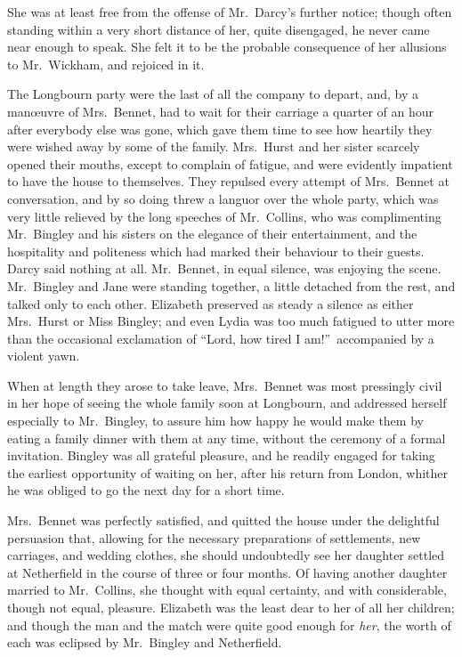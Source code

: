 \documentclass[12pt,english,oneside]{book}
\begin{document}
She was at least free from the offense of Mr.\ Darcy's further notice;
though often standing within a very short distance of her, quite disengaged,
he never came near enough to speak. She felt it to be the probable
consequence of her allusions to Mr.\ Wickham, and rejoiced in it.

The Longbourn party were the last of all the company to depart, and,
by a man\oe{}uvre of Mrs.\ Bennet, had to wait for their carriage
a quarter of an hour after everybody else was gone, which gave them
time to see how heartily they were wished away by some of the family.
Mrs.\ Hurst and her sister scarcely opened their mouths, except to
complain of fatigue, and were evidently impatient to have the house
to themselves. They repulsed every attempt of Mrs.\ Bennet at conversation,
and by so doing threw a languor over the whole party, which was very
little relieved by the long speeches of Mr.\ Collins, who was complimenting
Mr.\ Bingley and his sisters on the elegance of their entertainment,
and the hospitality and politeness which had marked their behaviour
to their guests. Darcy said nothing at all. Mr.\ Bennet, in equal
silence, was enjoying the scene. Mr.\ Bingley and Jane were standing
together, a little detached from the rest, and talked only to each
other. Elizabeth preserved as steady a silence as either Mrs.\ Hurst
or Miss Bingley; and even Lydia was too much fatigued to utter more
than the occasional exclamation of {}``Lord, how tired I am!''\ accompanied
by a violent yawn.

When at length they arose to take leave, Mrs.\ Bennet was most pressingly
civil in her hope of seeing the whole family soon at Longbourn, and
addressed herself especially to Mr.\ Bingley, to assure him how happy
he would make them by eating a family dinner with them at any time,
without the ceremony of a formal invitation. Bingley was all grateful
pleasure, and he readily engaged for taking the earliest opportunity
of waiting on her, after his return from London, whither he was obliged
to go the next day for a short time.

Mrs.\ Bennet was perfectly satisfied, and quitted the house under
the delightful persuasion that, allowing for the necessary preparations
of settlements, new carriages, and wedding clothes, she should undoubtedly
see her daughter settled at Netherfield in the course of three or
four months. Of having another daughter married to Mr.\ Collins,
she thought with equal certainty, and with considerable, though not
equal, pleasure. Elizabeth was the least dear to her of all her children;
and though the man and the match were quite good enough for \textit{her},
the worth of each was eclipsed by Mr.\ Bingley and Netherfield.
\end{document}
